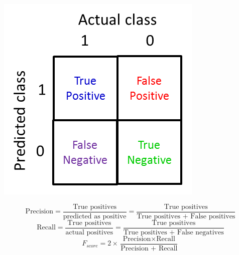 \documentclass{article}
\begin{document}
\begin{center}
\includegraphics[scale=0.6]{./images/precision_recall.png}
\end{center}

\[\text{Precision} = \frac{\text{True positives}}{\text{predicted as positive}} = \frac{\text{True positives}}{\text{True positives + False positives}}\]
\[\text{Recall} = \frac{\text{True positives}}{\text{actual positives}} = \frac{\text{True positives}}{\text{True positives + False negatives}}\]
\[F_{score} = 2 \times \frac{\text{Precision} \times \text{Recall}}{\text{Precision + Recall}}\]

\printindex
\end{document}
